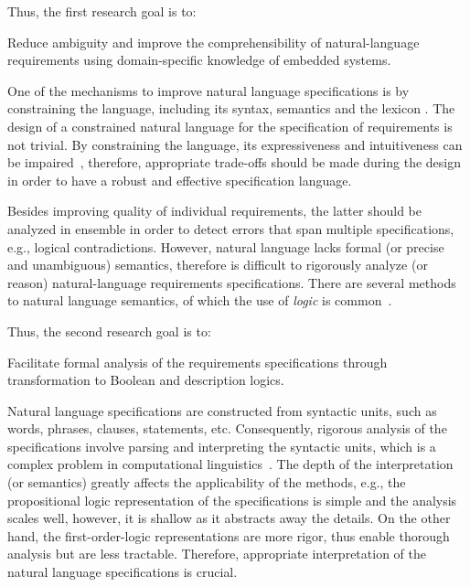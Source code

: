 Thus, the first research goal is to:
\setcounter{rgcounter}{1}
\begin{researchgoal}
Reduce ambiguity and improve the comprehensibility of natural-language requirements using domain-specific knowledge of embedded systems.
\end{researchgoal}

One of the mechanisms to improve natural language specifications is by constraining the language, including its syntax, semantics and the lexicon \cite{Kuhn2014ALanguages}. The design of a constrained natural language for the specification of requirements is not trivial. By constraining the language, its expressiveness and intuitiveness can be impaired~\cite{ieereqspecstandard}\cite{Myachykov2013SyntacticRussian}, therefore, appropriate trade-offs should be made during the design in order to have a robust and effective specification language.

Besides improving quality of individual requirements, the latter should be analyzed in ensemble in order to detect errors that span multiple specifications, e.g., logical contradictions. However, natural language lacks formal (or precise and unambiguous) semantics, therefore is difficult to rigorously analyze (or reason) natural-language requirements specifications. There are several methods to natural language semantics, of which the use of \textit{logic} is common~\cite{Clark2010TheProcessing}.

Thus, the second research goal is to:
\begin{researchgoal}
Facilitate formal analysis of the requirements specifications through transformation to Boolean and description logics.
\end{researchgoal}

Natural language specifications are constructed from syntactic units, such as words, phrases, clauses, statements, etc. Consequently, rigorous analysis of the specifications involve parsing and interpreting the syntactic units, which is a complex problem in computational linguistics~\cite{Clark2010TheProcessing}. The depth of the interpretation (or semantics) greatly affects the applicability of the methods, e.g., the propositional logic representation of the specifications is simple and the analysis scales well, however, it is shallow as it abstracts away the details. On the other hand, the first-order-logic representations are more rigor, thus enable thorough analysis but are less tractable. Therefore, appropriate interpretation of the natural language specifications is crucial.

